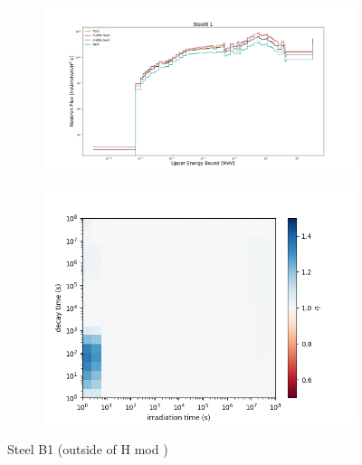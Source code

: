 \begin{figure}[!ht]
    \begin{subfigure}{0.5\textwidth}
        \includegraphics[scale=0.23, trim={4cm 1cm 4cm 2cm},clip]{figs/steelB1_flux.png}
    \end{subfigure}
    \begin{subfigure}{0.5\textwidth}
        \centering
        \includegraphics[scale=0.45, trim={0cm 0cm 2cm 0cm},clip]{figs/steelB1_front.png}
    \end{subfigure}
    \caption{Steel B1 (outside of H mod ) }
    \label{fig:1spec_8v}
\end{figure}
